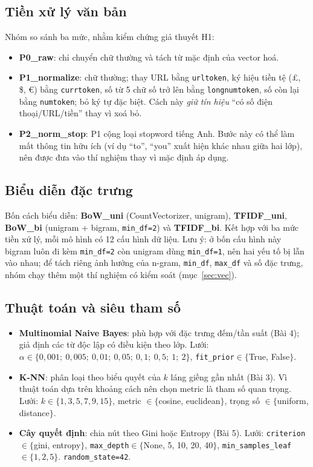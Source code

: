 \documentclass[12pt,a4paper]{article}
\begin{document}
\subsection{Tiền xử lý văn bản}
Nhóm so sánh ba mức, nhằm kiểm chứng giả thuyết H1:
\begin{itemize}[nosep]
\item \textbf{P0\_raw}: chỉ chuyển chữ thường và tách từ mặc định của vector hoá.
\item \textbf{P1\_normalize}: chữ thường; thay URL bằng \texttt{urltoken}, ký hiệu tiền tệ (£, \$, €) bằng \texttt{currtoken}, số từ 5 chữ số trở lên bằng \texttt{longnumtoken}, số còn lại bằng \texttt{numtoken}; bỏ ký tự đặc biệt. Cách này \emph{giữ tín hiệu} ``có số điện thoại/URL/tiền'' thay vì xoá bỏ.
\item \textbf{P2\_norm\_stop}: P1 cộng loại stopword tiếng Anh. Bước này có thể làm mất thông tin hữu ích (ví dụ ``to'', ``you'' xuất hiện khác nhau giữa hai lớp), nên được đưa vào thí nghiệm thay vì mặc định áp dụng.
\end{itemize}

\subsection{Biểu diễn đặc trưng}
Bốn cách biểu diễn: \textbf{BoW\_uni} (CountVectorizer, unigram), \textbf{TFIDF\_uni}, \textbf{BoW\_bi} (unigram + bigram, \texttt{min\_df=2}) và \textbf{TFIDF\_bi}. Kết hợp với ba mức tiền xử lý, mỗi mô hình có 12 cấu hình dữ liệu. Lưu ý: ở bốn cấu hình này bigram luôn đi kèm \texttt{min\_df=2} còn unigram dùng \texttt{min\_df=1}, nên hai yếu tố bị lẫn vào nhau; để tách riêng ảnh hưởng của n-gram, \texttt{min\_df}, \texttt{max\_df} và số đặc trưng, nhóm chạy thêm một thí nghiệm có kiểm soát (mục~\ref{sec:vec}).

\subsection{Thuật toán và siêu tham số}
\begin{itemize}[nosep]
\item \textbf{Multinomial Naive Bayes}: phù hợp với đặc trưng đếm/tần suất (Bài 4); giả định các từ độc lập có điều kiện theo lớp. Lưới: $\alpha\in\{0{,}001;\ 0{,}005;\ 0{,}01;\ 0{,}05;\ 0{,}1;\ 0{,}5;\ 1;\ 2\}$, \texttt{fit\_prior}$\in\{$True, False$\}$.
\item \textbf{K-NN}: phân loại theo biểu quyết của $k$ láng giềng gần nhất (Bài 3). Vì thuật toán dựa trên khoảng cách nên chọn metric là tham số quan trọng. Lưới: $k\in\{1,3,5,7,9,15\}$, metric $\in\{$cosine, euclidean$\}$, trọng số $\in\{$uniform, distance$\}$.
\item \textbf{Cây quyết định}: chia nút theo Gini hoặc Entropy (Bài 5). Lưới: \texttt{criterion}$\in\{$gini, entropy$\}$, \texttt{max\_depth}$\in\{$None, 5, 10, 20, 40$\}$, \texttt{min\_samples\_leaf}$\in\{1,2,5\}$. \texttt{random\_state=42}.
\end{itemize}
\end{document}
